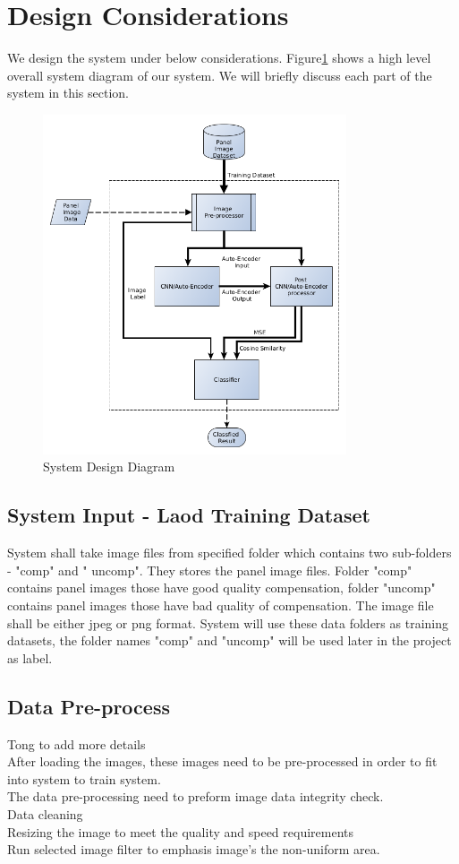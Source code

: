 \documentclass[runningheads]{llncs}
\begin{document}
\section{Design Considerations}
We design the system under below considerations. Figure\ref{fig:3} shows a high level overall system diagram of our system. We will briefly discuss each part of the system in this section.
\begin{figure}
    \centering
    \includegraphics[width=0.8\textwidth]{system_diagram.png}
    \caption{System Design Diagram}
    \label{fig:3}
\end{figure}
\subsection{System Input - Laod Training Dataset}
System shall take image files from specified folder which contains two sub-folders - "comp" and " uncomp". They stores the panel image files. Folder "comp" contains panel images those have good quality compensation, folder "uncomp" contains panel images those have bad quality of compensation. The image file shall be either jpeg or png format. System will use these data folders as training datasets, the folder names "comp" and "uncomp" will be used later in the project as label.
\subsection{Data Pre-process}
Tong to add more details\\
After loading the images, these images need to be pre-processed in order to fit into system to train system. \\
The data pre-processing need to preform image data integrity check.\\
Data cleaning\\
Resizing the image to meet the quality and speed requirements\\
Run selected image filter to emphasis image's the non-uniform area. 
\end{document}

